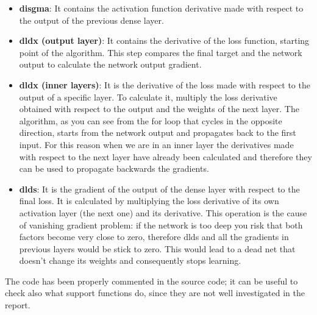 \begin{itemize}
	\item \textbf{disgma}: It contains the activation function derivative made with respect to the output of the previous dense layer.
	\item \textbf{dldx (output layer)}: It contains the derivative of the loss function, starting point of the algorithm. This step compares the final target and the network output to calculate the network output gradient.
	\item \textbf{dldx (inner layers)}: It is the derivative of the loss made with respect to the output of a specific layer. To calculate it, multiply the loss derivative obtained with respect to the output and the weights of the next layer. The algorithm, as you can see from the for loop that cycles in the opposite direction, starts from the network output and propagates back to the first input. For this reason when we are in an inner layer the derivatives made with respect to the next layer have already been calculated and therefore they can be used to propagate backwards the gradients. 
	\item \textbf{dlds}: It is the gradient of the output of the dense layer with respect to the final loss. It is calculated by multiplying the loss derivative of its own activation layer (the next one) and its derivative. This operation is the cause of vanishing gradient problem: if the network is too deep you risk that both factors become very close to zero, therefore dlds and all the gradients in previous layers would be stick to zero. This would lead to a dead net that doesn't change its weights and consequently stops learning.
\end{itemize}  


The code has been properly commented in the source code; it can be useful to check also what support functions do, since they are not well investigated in the report.

